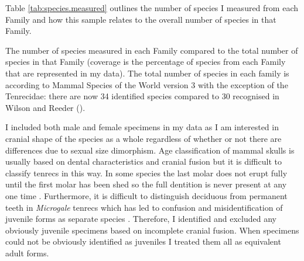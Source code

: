 	Table \ref{tab:species.measured} outlines the number of species I measured from each Family and how this sample relates to the overall number of species in that Family.



\begin{table}[h]
	\caption[Species measured] 
	{The number of species measured in each Family compared to the total number of species in that Family (coverage is the percentage of species from each Family that are represented in my data). The total number of species in each family is according to Mammal Species of the World version 3 \citep{Wilson2005} with the exception of the Tenrecidae: there are now 34 identified species compared to 30 recognised in Wilson and Reeder (\citeyear{Wilson2005}).}
		
	\label{tab:species.measured}
\end{table}
 

	I included both male and female specimens in my data as I am interested in cranial shape of the species as a whole regardless of whether or not there are differences due to sexual size dimorphism. Age classification of mammal skulls is usually based on dental characteristics and cranial fusion but it is difficult to classify tenrecs in this way. In some species the last molar does not erupt fully until the first molar has been shed so the full dentition is never present at any one time \citep{Nowak1983}. Furthermore, it is difficult to distinguish deciduous from permanent teeth in \textit{Microgale} tenrecs \citep{Asher2008} which has led to confusion and misidentification of juvenile forms as separate species \citep{Olson2004}.
	Therefore, I identified and excluded any obviously juvenile specimens based on incomplete cranial fusion. When specimens could not be obviously identified as juveniles I treated them all as equivalent adult forms. 	



\subsection{}

